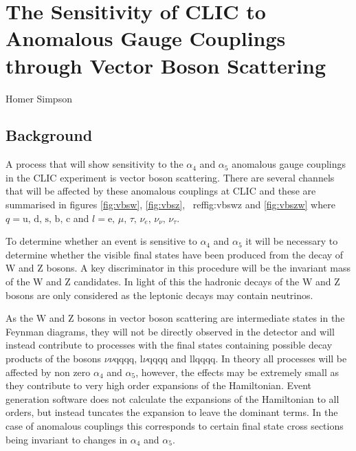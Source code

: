 \chapter{The Sensitivity of CLIC to Anomalous Gauge Couplings through Vector Boson Scattering}
\label{chap:PhysicsAnalysis}


%
{Homer Simpson}

\section{Background}

A process that will show sensitivity to the $\alpha_{4}$ and $\alpha_{5}$ anomalous gauge couplings in the CLIC experiment is vector boson scattering. There are several channels that will be affected by these anomalous couplings at CLIC and these are summarised in figures \ref{fig:vbsw}, \ref{fig:vbsz}, \ ref{fig:vbswz} and \ref{fig:vbszw} where $q = \text{u, d, s, b, c}$ and $l = \text{e, } \mu \text{, } \tau \text{, } \nu_{e} \text{, } \nu_{\nu} \text{, } \nu_{\tau}$.

To determine whether an event is sensitive to $\alpha_{4}$ and $\alpha_{5}$ it will be necessary to determine whether the visible final states have been produced from the decay of W and Z bosons. A key discriminator in this procedure will be the invariant mass of the W and Z candidates. In light of this the hadronic decays of the W and Z bosons are only considered as the leptonic decays may contain neutrinos.

As the W and Z bosons in vector boson scattering are intermediate states in the Feynman diagrams, they will not be directly observed in the detector and will instead contribute to processes with the final states containing possible decay products of the bosons $\nu\nu\text{qqqq}$, $\text{l}\nu\text{qqqq}$ and llqqqq. In theory all processes will be affected by non zero $\alpha_{4}$ and $\alpha_{5}$, however, the effects may be extremely small as they contribute to very high order expansions of the Hamiltonian. Event generation software does not calculate the expansions of the Hamiltonian to all orders, but instead tuncates the expansion to leave the dominant terms. In the case of anomalous couplings this corresponds to certain final state cross sections being invariant to changes in $\alpha_{4}$ and $\alpha_{5}$.

